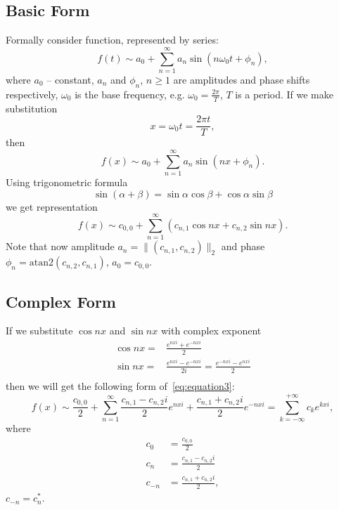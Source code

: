 \subsection{Basic Form}\label{subsec:basic-form}

    Formally consider function, represented by series:
    \begin{equation}\label{eq:equation}
        f(t) \sim a_0 + \sum_{n=1}^{\infty} a_n \sin (n \omega_0 t + \phi_n),
    \end{equation}
    where $a_0$ -- constant, $a_n$ and $\phi_n$, $n \geq 1$ are amplitudes and phase shifts respectively,
    $\omega_0$ is the base frequency, e.g. $\omega_0 = \frac{2\pi}{T}$, $T$  is a period.
    If we make substitution
    \[
        x = \omega_0 t  = \frac{2\pi t}{T},
    \]
    then
    \begin{equation}\label{eq:equation2}
        f(x) \sim a_0 + \sum_{n=1}^{\infty} a_n \sin (n x + \phi_n).
    \end{equation}
    Using trigonometric formula
    \[
        \sin (\alpha +  \beta)  = \sin \alpha \cos \beta + \cos \alpha \sin \beta
    \]
    we get representation
    \begin{equation}\label{eq:equation3}
        f(x) \sim c_{0, 0} + \sum_{n=1}^{\infty} \left( c_{n, 1} \cos nx + c_{n, 2} \sin nx \right).
    \end{equation}
    Note that now amplitude $a_n = \|(c_{n, 1}, c_{n, 2})\|_2$ and phase $\phi_n = \mathrm{atan2} (c_{n, 2}, c_{n, 1})$,
    $a_0 = c_{0, 0}$.

\subsection{Complex Form}\label{subsec:complex-form}

    If we substitute $\cos nx$ and $\sin nx$ with complex exponent
    \begin{align*}
        \cos nx = & \frac{e^{nxi} + e^{-nxi}}{2}   \\
        \sin nx = & \frac{e^{nxi} - e^{-nxi}}{2i} = \frac{e^{-nxi} - e^{nxi}}{2} \\
    \end{align*}
    then we will get the following form of~\ref{eq:equation3}:
    \begin{equation}\label{eq:equation4}
        f(x) \sim \frac{c_{0,0}}{2} + \sum_{n=1}^{\infty} \frac{c_{n, 1} - c_{n, 2}i}{2} e^{nxi} +
        \frac{c_{n, 1} + c_{n, 2}i}{2} e^{-nxi} = \allowbreak  \sum_{k=-\infty}^{+\infty} c_k e^{kxi},
    \end{equation}
    where
    \begin{align}
        c_0 & = \frac{c_{0, 0}}{2} \\
        c_n &= \frac{c_{n,1} - c_{n,2}i}{2} \\
        c_{-n} &= \frac{c_{n,1} + c_{n,2}i}{2},
    \end{align}
    $c_{-n} = c_n^{\ast}$.
